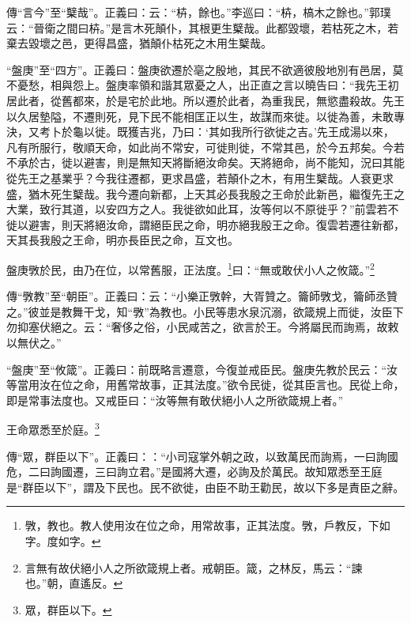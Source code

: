 {\noindent\zhuan{}\fzbyks 傳“言今”至“櫱哉”。正義曰：云：“枿，餘也。”李巡曰：“枿，槁木之餘也。”郭璞云：“晉衛之間曰枿。”是言木死顛仆，其根更生櫱哉。此都毀壞，若枯死之木，若棄去毀壞之邑，更得昌盛，猶顛仆枯死之木用生櫱哉。 \par}

{\noindent\shu{}\fzkt “盤庚”至“四方”。正義曰：盤庚欲遷於亳之殷地，其民不欲適彼殷地別有邑居，莫不憂愁，相與怨上。盤庚率領和諧其眾憂之人，出正直之言以曉告曰：“我先王初居此者，從舊都來，於是宅於此地。所以遷於此者，為重我民，無慾盡殺故。先王以久居墊隘，不遷則死，見下民不能相匡正以生，故謀而來徙。以徙為善，未敢專決，又考卜於龜以徙。既獲吉兆，乃曰：‘其如我所行欲徙之吉。’先王成湯以來，凡有所服行，敬順天命，如此尚不常安，可徙則徙，不常其邑，於今五邦矣。今若不承於古，徙以避害，則是無知天將斷絕汝命矣。天將絕命，尚不能知，況曰其能從先王之基業乎？今我往遷都，更求昌盛，若顛仆之木，有用生櫱哉。人衰更求盛，猶木死生櫱哉。我今遷向新都，上天其必長我殷之王命於此新邑，繼復先王之大業，致行其道，以安四方之人。我徙欲如此耳，汝等何以不原徙乎？”前雲若不徙以避害，則天將絕汝命，謂絕臣民之命，明亦絕我殷王之命。復雲若遷往新都，天其長我殷之王命，明亦長臣民之命，互文也。 \par}

盤庚斆於民，由乃在位，以常舊服，正法度。\footnote{斆，教也。教人使用汝在位之命，用常故事，正其法度。斆，戶教反，下如字。度如字。}曰：“無或敢伏小人之攸箴。”\footnote{言無有故伏絕小人之所欲箴規上者。戒朝臣。箴，之林反，馬云：“諫也。”朝，直遙反。}


{\noindent\zhuan{}\fzbyks 傳“斆教”至“朝臣”。正義曰：云：“小樂正斆幹，大胥贊之。籥師斆戈，籥師丞贊之。”彼並是教舞干戈，知“斆”為教也。小民等患水泉沉溺，欲箴規上而徙，汝臣下勿抑塞伏絕之。云：“奢侈之俗，小民咸苦之，欲言於王。今將屬民而詢焉，故敕以無伏之。” \par}

{\noindent\shu{}\fzkt “盤庚”至“攸箴”。正義曰：前既略言遷意，今復並戒臣民。盤庚先教於民云：“汝等當用汝在位之命，用舊常故事，正其法度。”欲令民徙，從其臣言也。民從上命，即是常事法度也。又戒臣曰：“汝等無有敢伏絕小人之所欲箴規上者。” \par}

王命眾悉至於庭。\footnote{眾，群臣以下。}

{\noindent\zhuan{}\fzbyks 傳“眾，群臣以下”。正義曰：：“小司寇掌外朝之政，以致萬民而詢焉，一曰詢國危，二曰詢國遷，三曰詢立君。”是國將大遷，必詢及於萬民。故知眾悉至王庭是“群臣以下”，謂及下民也。民不欲徙，由臣不助王勸民，故以下多是責臣之辭。 \par}

